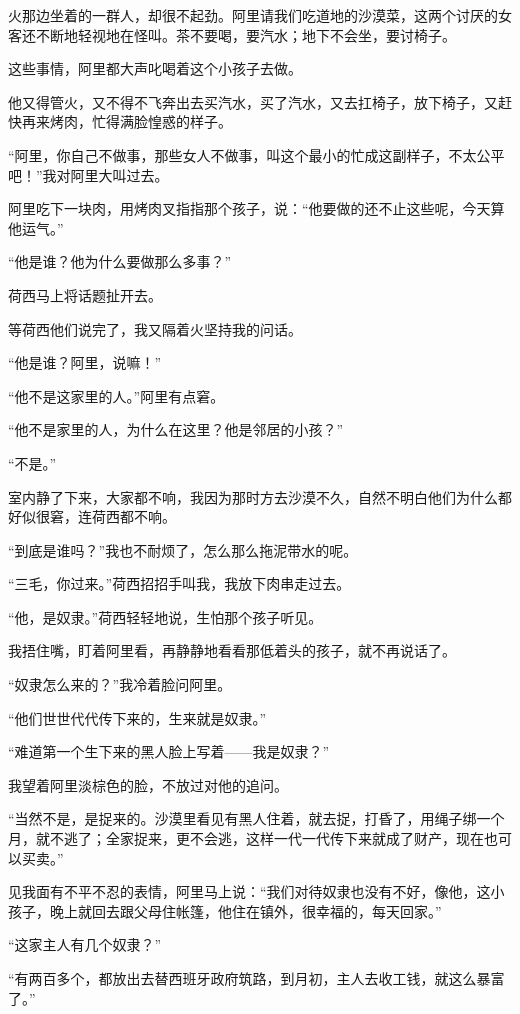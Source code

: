 \par 火那边坐着的一群人，却很不起劲。阿里请我们吃道地的沙漠菜，这两个讨厌的女客还不断地轻视地在怪叫。茶不要喝，要汽水；地下不会坐，要讨椅子。
\par 这些事情，阿里都大声叱喝着这个小孩子去做。
\par 他又得管火，又不得不飞奔出去买汽水，买了汽水，又去扛椅子，放下椅子，又赶快再来烤肉，忙得满脸惶惑的样子。
\par “阿里，你自己不做事，那些女人不做事，叫这个最小的忙成这副样子，不太公平吧！”我对阿里大叫过去。
\par 阿里吃下一块肉，用烤肉叉指指那个孩子，说：“他要做的还不止这些呢，今天算他运气。”
\par “他是谁？他为什么要做那么多事？”
\par 荷西马上将话题扯开去。
\par 等荷西他们说完了，我又隔着火坚持我的问话。
\par “他是谁？阿里，说嘛！”
\par “他不是这家里的人。”阿里有点窘。
\par “他不是家里的人，为什么在这里？他是邻居的小孩？”
\par “不是。”
\par 室内静了下来，大家都不响，我因为那时方去沙漠不久，自然不明白他们为什么都好似很窘，连荷西都不响。
\par “到底是谁吗？”我也不耐烦了，怎么那么拖泥带水的呢。
\par “三毛，你过来。”荷西招招手叫我，我放下肉串走过去。
\par “他，是奴隶。”荷西轻轻地说，生怕那个孩子听见。
\par 我捂住嘴，盯着阿里看，再静静地看看那低着头的孩子，就不再说话了。
\par “奴隶怎么来的？”我冷着脸问阿里。
\par “他们世世代代传下来的，生来就是奴隶。”
\par “难道第一个生下来的黑人脸上写着——我是奴隶？”
\par 我望着阿里淡棕色的脸，不放过对他的追问。
\par “当然不是，是捉来的。沙漠里看见有黑人住着，就去捉，打昏了，用绳子绑一个月，就不逃了；全家捉来，更不会逃，这样一代一代传下来就成了财产，现在也可以买卖。”
\par 见我面有不平不忍的表情，阿里马上说：“我们对待奴隶也没有不好，像他，这小孩子，晚上就回去跟父母住帐篷，他住在镇外，很幸福的，每天回家。”
\par “这家主人有几个奴隶？”
\par “有两百多个，都放出去替西班牙政府筑路，到月初，主人去收工钱，就这么暴富了。”
